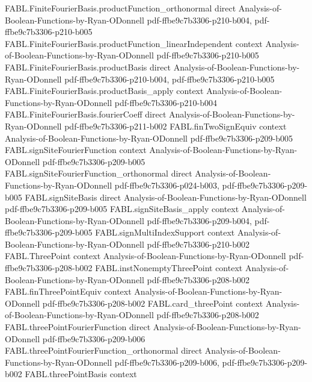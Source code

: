 \begin{theorem}
\proofstep
  {FABL.FiniteFourierBasis.productFunction_orthonormal}
  {direct}
  {Analysis-of-Boolean-Functions-by-Ryan-ODonnell}
  {pdf-ffbe9c7b3306-p210-b004,
    pdf-ffbe9c7b3306-p210-b005}
\proofstep
  {FABL.FiniteFourierBasis.productFunction_linearIndependent}
  {context}
  {Analysis-of-Boolean-Functions-by-Ryan-ODonnell}
  {pdf-ffbe9c7b3306-p210-b005}
\proofstep
  {FABL.FiniteFourierBasis.productBasis}
  {direct}
  {Analysis-of-Boolean-Functions-by-Ryan-ODonnell}
  {pdf-ffbe9c7b3306-p210-b004,
    pdf-ffbe9c7b3306-p210-b005}
\proofstep
  {FABL.FiniteFourierBasis.productBasis_apply}
  {context}
  {Analysis-of-Boolean-Functions-by-Ryan-ODonnell}
  {pdf-ffbe9c7b3306-p210-b004}
\proofstep
  {FABL.FiniteFourierBasis.fourierCoeff}
  {direct}
  {Analysis-of-Boolean-Functions-by-Ryan-ODonnell}
  {pdf-ffbe9c7b3306-p211-b002}
\proofstep
  {FABL.finTwoSignEquiv}
  {context}
  {Analysis-of-Boolean-Functions-by-Ryan-ODonnell}
  {pdf-ffbe9c7b3306-p209-b005}
\proofstep
  {FABL.signSiteFourierFunction}
  {context}
  {Analysis-of-Boolean-Functions-by-Ryan-ODonnell}
  {pdf-ffbe9c7b3306-p209-b005}
\proofstep
  {FABL.signSiteFourierFunction_orthonormal}
  {direct}
  {Analysis-of-Boolean-Functions-by-Ryan-ODonnell}
  {pdf-ffbe9c7b3306-p024-b003,
    pdf-ffbe9c7b3306-p209-b005}
\proofstep
  {FABL.signSiteBasis}
  {direct}
  {Analysis-of-Boolean-Functions-by-Ryan-ODonnell}
  {pdf-ffbe9c7b3306-p209-b005}
\proofstep
  {FABL.signSiteBasis_apply}
  {context}
  {Analysis-of-Boolean-Functions-by-Ryan-ODonnell}
  {pdf-ffbe9c7b3306-p209-b004,
    pdf-ffbe9c7b3306-p209-b005}
\proofstep
  {FABL.signMultiIndexSupport}
  {context}
  {Analysis-of-Boolean-Functions-by-Ryan-ODonnell}
  {pdf-ffbe9c7b3306-p210-b002}
\proofstep
  {FABL.ThreePoint}
  {context}
  {Analysis-of-Boolean-Functions-by-Ryan-ODonnell}
  {pdf-ffbe9c7b3306-p208-b002}
\proofstep
  {FABL.instNonemptyThreePoint}
  {context}
  {Analysis-of-Boolean-Functions-by-Ryan-ODonnell}
  {pdf-ffbe9c7b3306-p208-b002}
\proofstep
  {FABL.finThreePointEquiv}
  {context}
  {Analysis-of-Boolean-Functions-by-Ryan-ODonnell}
  {pdf-ffbe9c7b3306-p208-b002}
\proofstep
  {FABL.card_threePoint}
  {context}
  {Analysis-of-Boolean-Functions-by-Ryan-ODonnell}
  {pdf-ffbe9c7b3306-p208-b002}
\proofstep
  {FABL.threePointFourierFunction}
  {direct}
  {Analysis-of-Boolean-Functions-by-Ryan-ODonnell}
  {pdf-ffbe9c7b3306-p209-b006}
\proofstep
  {FABL.threePointFourierFunction_orthonormal}
  {direct}
  {Analysis-of-Boolean-Functions-by-Ryan-ODonnell}
  {pdf-ffbe9c7b3306-p209-b006,
    pdf-ffbe9c7b3306-p209-b002}
\proofstep
  {FABL.threePointBasis}
  {context}

\end{theorem}
